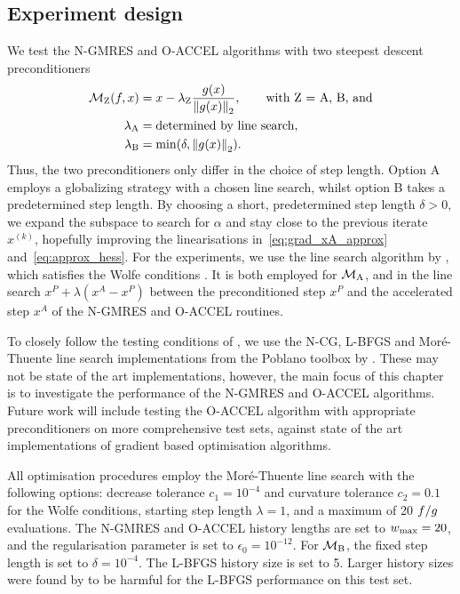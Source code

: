 \documentclass[main.tex]{subfiles}
\begin{document}
\subsection{Experiment design}\label{subsec:experiment_design}
We test the N-GMRES and O-ACCEL algorithms with two steepest descent
preconditioners
\begin{align}
  \mathcal{M}_{\text{Z}}(f,x) &= x-\lambda_{\text{Z}} \frac{g(x)}{\left\lVert g(x)\right\rVert_2}, \qquad
                               \text{with Z = A, B, and}\nonumber\\
  \lambda_{\text{A}} &= \text{determined by line search},\\
  \lambda_{\text{B}} &= \min(\delta,\left\lVert g(x)\right\rVert_2).
\end{align}
Thus, the two preconditioners only differ in the choice of step
length. Option A employs a globalizing strategy with a chosen line
search, whilst option B takes a predetermined step length.  By
choosing a short, predetermined step length $\delta>0$, we expand the
subspace to search for $\alpha$ and stay close to the previous iterate
$x^{(k)}$, hopefully improving the linearisations
in~\eqref{eq:grad_xA_approx} and~\eqref{eq:approx_hess}.  For the
experiments, we use the line search algorithm by \citet{more1994line},
which satisfies the Wolfe conditions \citep{nocedal2006numerical}.  It
is both employed for $\mathcal{M}_{\text{A}}$, and in the line search
$x^P+\lambda(x^A-x^P)$ between the preconditioned step $x^P$ and the
accelerated step $x^A$ of the N-GMRES and O-ACCEL routines.

To closely follow the testing conditions of
\citet{sterck2013steepest}, we use the N-CG, L-BFGS and
Mor\'{e}-Thuente line search implementations from the Poblano toolbox
by \citet{dunlavy2010poblano}.  These may not be state of the art
implementations, however, the main focus of this chapter is to
investigate the performance of the N-GMRES and O-ACCEL
algorithms. Future work will include testing the O-ACCEL algorithm
with appropriate preconditioners on more comprehensive test sets,
against state of the art implementations of gradient based
optimisation algorithms.

All optimisation procedures employ the Mor\'{e}-Thuente line search
with the following options: decrease tolerance $c_1=10^{-4}$ and
curvature tolerance $c_2=0.1$ for the Wolfe conditions, starting step
length $\lambda=1$, and a maximum of \num{20} $f/g$
evaluations.  The N-GMRES and O-ACCEL history lengths are set to
$w_{\textnormal{max}}=20$, and the regularisation parameter is set to
$\epsilon_0=10^{-12}$.  For $\mathcal{M}_{\text{B}}$, the fixed step
length is set to $\delta=10^{-4}$.  The L-BFGS history size is set to
\num{5}. Larger history sizes were found by \citet{sterck2013steepest}
to be harmful for the L-BFGS performance on this test set.
\end{document}
